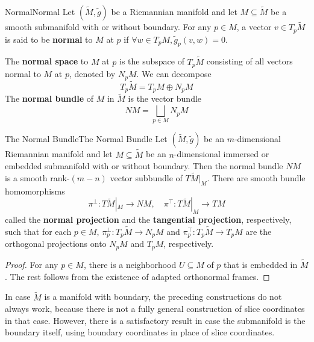 \documentclass[../main.tex]{subfiles}
\begin{document}
\begin{definition}{Normal}{Normal}
	Let $(\tilde{M}, \tilde{g})$ be a Riemannian manifold and let $M \subseteq \tilde{M}$ be a smooth submanifold with or without boundary. For any $p\in M$, a vector $v \in T_p\tilde{M}$ is said to be \textbf{normal} to $M$ at $p$ if $\forall w \in T_pM, \tilde{g}_p(v, w) = 0$.

	The \textbf{normal space} to $M$ at $p$ is the subspace of $T_p\tilde{M}$ consisting of all vectors normal to $M$ at $p$, denoted by $N_pM$. We can decompose
	\begin{equation}
		T_p\tilde{M} = T_pM \oplus N_pM
	\end{equation}
	The \textbf{normal bundle} of $M$ in $\tilde{M}$ is the vector bundle
	\begin{equation}
		NM = \bigsqcup_{p \in M} N_pM
	\end{equation}
\end{definition}

\begin{proposition}{The Normal Bundle}{The Normal Bundle}
	Let $(\tilde{M}, \tilde{g})$ be an $m$-dimensional Riemannian manifold and let $M \subseteq \tilde{M}$ be an $n$-dimensional immersed or embedded submanifold with or without boundary. Then the normal bundle $NM$ is a smooth rank-$(m-n)$ vector subbundle of $T\tilde{M}|_M$. There are smooth bundle homomorphisms
	\begin{equation}
		\pi^{\perp}: T\tilde{M}|_M \to NM, \quad \pi^{\top}: T\tilde{M}|_M \to TM
	\end{equation}
	called the \textbf{normal projection} and the \textbf{tangential projection}, respectively, such that for each $p \in M$, $\pi^{\perp}_p: T_p\tilde{M} \to N_pM$ and $\pi^{\top}_p: T_p\tilde{M} \to T_pM$ are the orthogonal projections onto $N_pM$ and $T_pM$, respectively.
\end{proposition}
\begin{proof}
	For any $p \in M$, there is a neighborhood $U \subseteq M$ of $p$ that is embedded in $\tilde{M}$. The rest follows from the existence of adapted orthonormal frames.
\end{proof}

\begin{remark}
	In case $\tilde{M}$ is a manifold with boundary, the preceding constructions do not always work, because there is not a fully general construction of slice coordinates in that case. However, there is a satisfactory result in case the submanifold is the boundary itself, using boundary coordinates in place of slice coordinates.
\end{remark}
\end{document}

